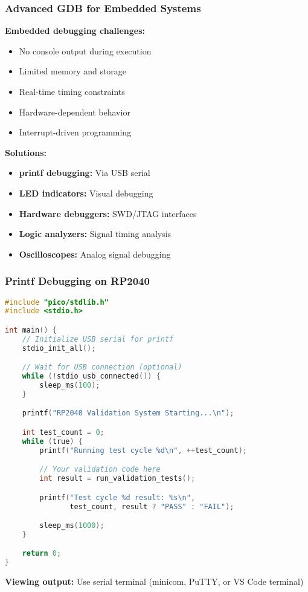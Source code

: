 \documentclass{beamer}
\begin{document}
\begin{frame}
\frametitle{Advanced GDB for Embedded Systems}
\textbf{Embedded debugging challenges:}
\begin{itemize}
    \item No console output during execution
    \item Limited memory and storage
    \item Real-time timing constraints
    \item Hardware-dependent behavior
    \item Interrupt-driven programming
\end{itemize}

\vspace{0.5cm}
\textbf{Solutions:}
\begin{itemize}
    \item \textbf{printf debugging:} Via USB serial
    \item \textbf{LED indicators:} Visual debugging
    \item \textbf{Hardware debuggers:} SWD/JTAG interfaces
    \item \textbf{Logic analyzers:} Signal timing analysis
    \item \textbf{Oscilloscopes:} Analog signal debugging
\end{itemize}
\end{frame}

\begin{frame}[fragile]
\frametitle{Printf Debugging on RP2040}
\begin{lstlisting}[language=C]
#include "pico/stdlib.h"
#include <stdio.h>

int main() {
    // Initialize USB serial for printf
    stdio_init_all();

    // Wait for USB connection (optional)
    while (!stdio_usb_connected()) {
        sleep_ms(100);
    }

    printf("RP2040 Validation System Starting...\n");

    int test_count = 0;
    while (true) {
        printf("Running test cycle %d\n", ++test_count);

        // Your validation code here
        int result = run_validation_tests();

        printf("Test cycle %d result: %s\n",
               test_count, result ? "PASS" : "FAIL");

        sleep_ms(1000);
    }

    return 0;
}
\end{lstlisting}

\textbf{Viewing output:} Use serial terminal (minicom, PuTTY, or VS Code terminal)
\end{frame}
\end{document}
